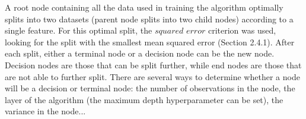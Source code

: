 A root node containing all the data used in training the algorithm optimally splits into two datasets (parent node splits into two child nodes) according to a single feature. For this optimal split, the $squared$ $error$ criterion was used, looking for the split with the smallest mean squared error (Section 2.4.1). After each split, either a terminal node or a decision node can be the new node. Decision nodes are those that can be split further, while end nodes are those that are not able to further split. There are several ways to determine whether a node will be a decision or terminal node: the number of observations in the node, the layer of the algorithm (the maximum depth hyperparameter can be set), the variance in the node...\\\\


